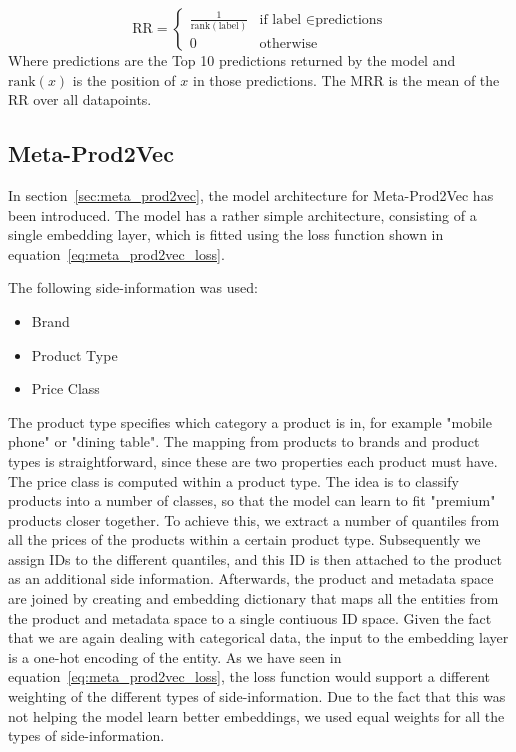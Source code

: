 \begin{equation}\label{eq:reciprocal_rank}
    \text{RR} = 
    \begin{cases}
        \frac{1}{\text{rank}(\text{label})} & \text{if label } \in \text{predictions} \\
        0 & \text{otherwise}
    \end{cases}
\end{equation}
Where predictions are the Top 10 predictions returned by the model and $\text{rank}(x)$ is the position of $x$ in those predictions.
The MRR is the mean of the RR over all datapoints.

\subsection{Meta-Prod2Vec}
In section~\ref{sec:meta_prod2vec}, the model architecture for Meta-Prod2Vec has been introduced.
The model has a rather simple architecture, consisting of a single embedding layer, which is fitted using the loss function shown in equation~\ref{eq:meta_prod2vec_loss}.
\par
The following side-information was used:
\begin{itemize}
    \item Brand
    \item Product Type
    \item Price Class
\end{itemize}
The product type specifies which category a product is in, for example "mobile phone" or "dining table".
The mapping from products to brands and product types is straightforward, since these are two properties each product must have.
The price class is computed within a product type.
The idea is to classify products into a number of classes, so that the model can learn to fit "premium" products closer together.
To achieve this, we extract a number of quantiles from all the prices of the products within a certain product type.
Subsequently we assign IDs to the different quantiles, and this ID is then attached to the product as an additional side information.
Afterwards, the product and metadata space are joined by creating and embedding dictionary that maps all the entities from the product and metadata space to a single contiuous ID space.
Given the fact that we are again dealing with categorical data, the input to the embedding layer is a one-hot encoding of the entity.
As we have seen in equation~\ref{eq:meta_prod2vec_loss}, the loss function would support a different weighting of the different types of side-information.
Due to the fact that this was not helping the model learn better embeddings, we used equal weights for all the types of side-information.
